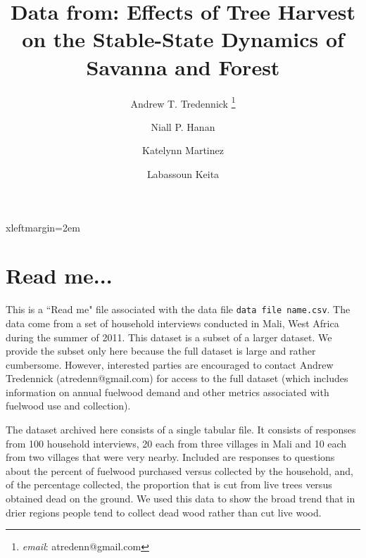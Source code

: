 \documentclass[12pt]{article}
\begin{document}



 {xleftmargin=2em}

\title{Data from: Effects of Tree Harvest on the Stable-State Dynamics of Savanna and Forest}

\author[1]{Andrew T. Tredennick \thanks{\emph{email}: atredenn@gmail.com}}
\author[2]{Niall P. Hanan}
\author[3]{Katelynn Martinez}
\author[4]{Labassoun Keita}
\date{}
\maketitle

\section*{Read me...}
This is a ``Read me" file associated with the data file {\tt data file name.csv}. The data come from a set of household interviews conducted in Mali, West Africa during the summer of 2011. This dataset is a subset of a larger dataset. We provide the subset only here because the full dataset is large and rather cumbersome. However, interested parties are encouraged to contact Andrew Tredennick (atredenn@gmail.com) for access to the full dataset (which includes information on annual fuelwood demand and other metrics associated with fuelwood use and collection).

The dataset archived here consists of a single tabular file. It consists of responses from 100 household interviews, 20 each from three villages in Mali and 10 each from two villages that were very nearby. Included are responses to questions about the percent of fuelwood purchased versus collected by the household, and, of the percentage collected, the proportion that is cut from live trees versus obtained dead on the ground. We used this data to show the broad trend that in drier regions people tend to collect dead wood rather than cut live wood. 
\end{document}

